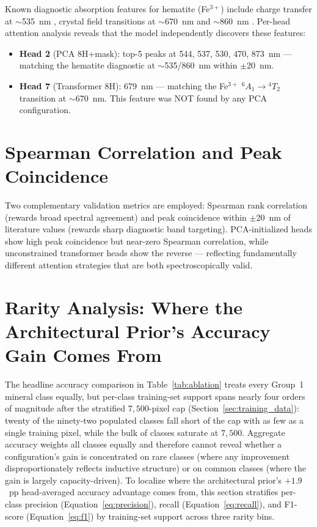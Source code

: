 \documentclass[11pt]{report}
\begin{document}
Known diagnostic absorption features for hematite (Fe$^{3+}$) include charge transfer at $\sim$535~nm \cite{Jiang2014AlGoethite}, crystal field transitions at $\sim$670~nm and $\sim$860~nm \cite{clark1999,burns1993,sherman1985}. Per-head attention analysis reveals that the model independently discovers these features:

\begin{itemize}
  \item \textbf{Head 2} (PCA 8H+mask): top-5 peaks at 544, 537, 530, 470, 873~nm --- matching the hematite diagnostic at $\sim$535/860~nm within $\pm$20~nm.
  \item \textbf{Head 7} (Transformer 8H): 679~nm --- matching the Fe$^{3+}$ $^6A_1 \rightarrow {}^4T_2$ transition at $\sim$670~nm. This feature was NOT found by any PCA configuration.
\end{itemize}

\section{Spearman Correlation and Peak Coincidence}

Two complementary validation metrics are employed: Spearman rank correlation (rewards broad spectral agreement) and peak coincidence within $\pm$20~nm of literature values (rewards sharp diagnostic band targeting). PCA-initialized heads show high peak coincidence but near-zero Spearman correlation, while unconstrained transformer heads show the reverse --- reflecting fundamentally different attention strategies that are both spectroscopically valid.

\section{Rarity Analysis: Where the Architectural Prior's Accuracy Gain Comes From}
\label{sec:rarity}

The headline accuracy comparison in Table~\ref{tab:ablation} treats every Group~1 mineral class equally, but per-class training-set support spans nearly four orders of magnitude after the stratified $7{,}500$-pixel cap (Section~\ref{sec:training_data}): twenty of the ninety-two populated classes fall short of the cap with as few as a single training pixel, while the bulk of classes saturate at $7{,}500$. Aggregate accuracy weights all classes equally and therefore cannot reveal whether a configuration's gain is concentrated on rare classes (where any improvement disproportionately reflects inductive structure) or on common classes (where the gain is largely capacity-driven). To localize where the architectural prior's $+1.9$~pp head-averaged accuracy advantage comes from, this section stratifies per-class precision (Equation~\ref{eq:precision}), recall (Equation~\ref{eq:recall}), and F1-score (Equation~\ref{eq:f1}) by training-set support across three rarity bins.
\end{document}
